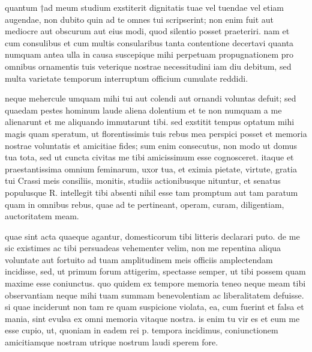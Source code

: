 


 quantum †ad meum studium exstiterit dignitatis tuae vel tuendae vel etiam augendae, non dubito quin ad te omnes tui scripserint; non enim fuit aut mediocre aut obscurum aut eius modi, quod silentio posset praeteriri. nam et cum consulibus et cum multis consularibus tanta contentione decertavi quanta numquam antea ulla in causa suscepique mihi perpetuam propugnationem pro omnibus ornamentis tuis veterique nostrae necessitudini iam diu debitum, sed multa varietate temporum interruptum officium cumulate reddidi.

 neque mehercule umquam mihi tui aut colendi aut ornandi voluntas defuit; sed quaedam pestes hominum laude aliena dolentium et te non numquam a me alienarunt et me aliquando immutarunt tibi. sed exstitit tempus optatum mihi magis quam speratum, ut florentissimis tuis rebus mea perspici posset et memoria nostrae voluntatis et amicitiae fides; sum enim consecutus, non modo ut domus tua tota, sed ut cuncta civitas me tibi amicissimum esse cognosceret. itaque et praestantissima omnium feminarum, uxor tua, et eximia pietate, virtute, gratia tui Crassi meis consiliis, monitis, studiis actionibusque nituntur, et senatus populusque R. intellegit tibi absenti nihil esse tam promptum aut tam paratum quam in omnibus rebus, quae ad te pertineant, operam, curam, diligentiam, auctoritatem meam.

 quae sint acta quaeque agantur, domesticorum tibi litteris declarari puto. de me sic existimes ac tibi persuadeas vehementer velim, non me repentina aliqua voluntate aut fortuito ad tuam amplitudinem meis officiis amplectendam incidisse, sed, ut primum forum attigerim, spectasse semper, ut tibi possem quam maxime esse coniunctus. quo quidem ex tempore memoria teneo neque meam tibi observantiam neque mihi tuam summam benevolentiam ac liberalitatem defuisse. si quae inciderunt non tam re quam suspicione violata, ea, cum fuerint et falsa et mania, sint evulsa ex omni memoria vitaque nostra. is enim tu vir es et eum me esse cupio, ut, quoniam in eadem rei p. tempora incidimus, coniunctionem amicitiamque nostram utrique nostrum laudi sperem fore.

